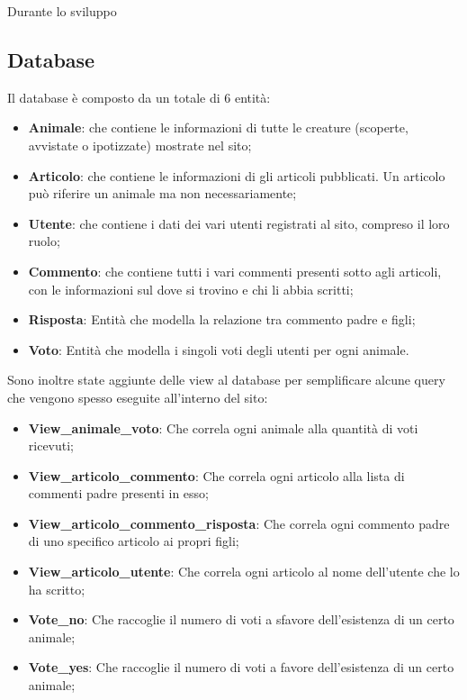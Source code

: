 Durante lo sviluppo 

\subsection{Database}
Il database è composto da un totale di 6 entità:
\begin{itemize}
	\item \textbf{Animale}: che contiene le informazioni di tutte le creature (scoperte, avvistate o ipotizzate) mostrate nel sito;
	\item \textbf{Articolo}: che contiene le informazioni di gli articoli pubblicati. Un articolo può riferire un animale ma non necessariamente;
	\item \textbf{Utente}: che contiene i dati dei vari utenti registrati al sito, compreso il loro ruolo;
	\item \textbf{Commento}: che contiene tutti i vari commenti presenti sotto agli articoli, con le informazioni sul dove si trovino e chi li abbia scritti;
	\item \textbf{Risposta}: Entità che modella la relazione tra commento padre e figli;
	\item \textbf{Voto}: Entità che modella  i singoli voti degli utenti per ogni animale.
\end{itemize}
Sono inoltre state aggiunte delle view al database per semplificare alcune query che vengono spesso eseguite all'interno del sito:
\begin{itemize}
	\item \textbf{View\_animale\_voto}: Che correla ogni animale alla quantità di voti ricevuti;
	\item \textbf{View\_articolo\_commento}: Che correla ogni articolo alla lista di commenti padre presenti in esso;
	\item \textbf{View\_articolo\_commento\_risposta}: Che correla ogni commento padre di uno specifico articolo ai propri figli;
	\item \textbf{View\_articolo\_utente}: Che correla ogni articolo al nome dell'utente che lo ha scritto;
	\item \textbf{Vote\_no}: Che raccoglie il numero di voti a sfavore dell'esistenza di un certo animale;
	\item \textbf{Vote\_yes}: Che raccoglie il numero di voti a favore dell'esistenza di un certo animale;
\end{itemize}

